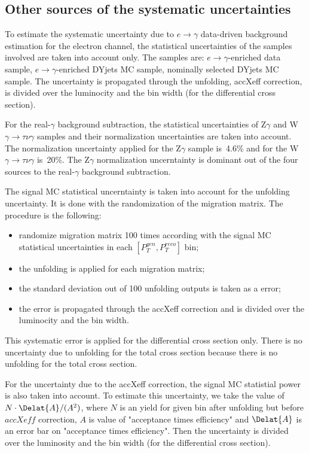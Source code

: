 \subsection{Other sources of the systematic uncertainties}

To estimate the systematic uncertainty due to $e\rightarrow\gamma$ data-driven background estimation for the electron channel, the statistical uncertainties of the samples involved are taken into account only. The samples are: $e\rightarrow\gamma$-enriched data sample, $e\rightarrow\gamma$-enriched DYjets MC sample, nominally selected DYjets MC sample. The uncertainty is propagated through the unfolding, accXeff correction, is divided over the luminocity and the bin width (for the differential cross section).

For the real-$\gamma$ background subtraction, the statistical uncertainties of Z$\gamma$ and W$\gamma\rightarrow\tau\nu\gamma$ samples and their normalization uncertainties are taken into account. The normalization uncertainty applied for the Z$\gamma$ sample is~4.6\% and for the W$\gamma\rightarrow\tau\nu\gamma$ is~20\%. The Z$\gamma$ normalization uncerntainty is dominant out of the four sources to the real-$\gamma$ background subtraction.

The signal MC statistical uncerntainty is taken into account for the unfolding uncertainty. It is done with the randomization of the migration matrix. The procedure is the following:

\begin{itemize}
  \item randomize migration matrix 100 times according with the signal MC statistical uncertainties in each $[P_T^{gen},P_T^{reco}]$ bin;
  \item the unfolding is applied for each migration matrix;
  \item the standard deviation out of 100 unfolding outputs is taken as a error;
  \item the error is propagated through the accXeff correction and is divided over the luminocity and the bin width.
\end{itemize}

This systematic error is applied for the differential cross section only. There is no uncertainty due to unfolding for the total cross section because there is no unfolding for the total cross section.

For the uncertainty due to the accXeff correction, the signal MC statistial power is also taken into account. To estimate this uncertainty, we take the value of $N \cdot \Delat{A} / (A^2)$, where $N$ is an yield for given bin after unfolding but before $accXeff$ correction, $A$ is value of "acceptance times efficiency" and $\Delat{A}$ is an error bar on "acceptance times efficiency". Then the uncertainty is divided over the luminosity and the bin width (for the differential cross section).

